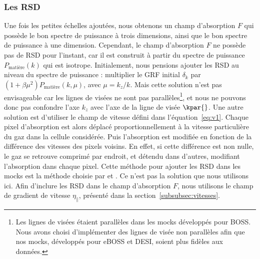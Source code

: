 \subsubsection{Les RSD}
\label{subsubsec:rsdlya}
Une fois les petites échelles ajoutées, nous obtenons un champ d'absorption $F$ qui possède le bon spectre de puissance à trois dimensions, ainsi que le bon spectre de puissance à une dimension.
Cependant, le champ d'absorption $F$ ne possède pas de RSD pour l'instant, car il est construit à partir du spectre de puissance $P_{\mathrm{matière}}(k)$ qui est isotrope.
Initialement, nous pensions ajouter les RSD au niveau du spectre de puissance : multiplier le GRF initial $\delta_k$ par $(1 + \beta \mu^2)P_{\mathrm{matière}}(k, \mu)$, avec $\mu = k_z / k$.
Mais cette solution n'est pas envisageable car les lignes de visées ne sont pas parallèles\footnote{Les lignes de visées étaient parallèles dans les mocks développés pour BOSS. Nous avons choisi d'implémenter des lignes de visée non parallèles afin que nos mocks, développés pour eBOSS et DESI, soient plus fidèles aux données.}, et nous ne pouvons donc pas confondre l'axe $k_z$ avec l'axe de la ligne de visée $\kpar{}$.
Une autre solution est d'utiliser le champ de vitesse défini dans l'équation~\ref{eq:v1}. Chaque pixel d'absorption est alors déplacé proportionnellement à la vitesse particulière du gaz dans la cellule considérée. Puis l'absorption est modifiée en fonction de la différence des vitesses des pixels voisins. En effet, si cette différence est non nulle, le gaz se retrouve comprimé par endroit, et détendu dans d'autres, modifiant l'absorption dans chaque pixel.
Cette méthode pour ajouter les RSD dans les mocks \lya{} est la méthode choisie par \textcite{LeGoff2011} et \textcite{Farr2019}.
Ce n'est pas la solution que nous utilisons ici. Afin d'inclure les RSD dans le champ d'absorption $F$, nous utilisons le champ de gradient de vitesse $\eta_{\parallel}$, présenté dans la section~\ref{subsubsec:vitesses}.
